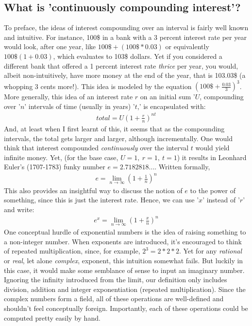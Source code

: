 \documentclass[11pt,a4paper]{article}
\begin{document}
\subsection{What is 'continuously compounding interest'?}
To preface, the ideas of interest compounding over an interval is fairly well known and intuitive. For instance, 100\$  in a bank with a 3 percent interest rate per year would look, after one year,  like $100\$ +(100\$*0.03)$ or equivalently $100\$(1+0.03)$, which evaluates to 103\$ dollars. Yet if you considered a different bank that offered a 1 percent interest rate \textit{thrice} per year, you would, albeit non-intuitively, have more money at the end of the year, that is 103.03\$ (a whopping 3 cents more!). This idea is modeled by the equation $(100\$ + \frac{0.03}{3})^3$.  More generally, this idea of an interest rate $r$ on an initial sum '$U$, compounding over '$n$' intervals of time (usually in years) '$t$,' is encapsulated with:
\begin{align*}
total = U \left(  1 + \frac{r}{n} \right)  ^{nt}
\end{align*}
And, at least when I first learnt of this, it seems that as the compounding intervals, the total gets larger and larger, although incrementally.  One would think that interest compounded \textit{continuously} over the interval $t$ would yield infinite money. Yet,  (for the base case, $U=1,\  r=1, \ t=1$) it results in Leonhard Euler's (1707-1783) funky number $e = 2.7182818...$. Written formally,
\begin{align*}
e = \lim_{n \to \infty} \left( 1+ \frac{1}{n} \right) ^n
\end{align*}
This also provides an insightful way to discuss the notion of $e$ to the power of something, since this is just the interest rate. Hence,  we can use '$x$' instead of '$r$' and write:
\begin{align*}
e^x = \lim_{n \to \infty} \left( 1+ \frac{x}{n} \right) ^n
\end{align*}
One conceptual hurdle of exponential numbers is the idea of raising something to a non-integer number.  When exponents are introduced, it's encouraged to think of repeated multiplication, since, for example, $2^3 = 2*2*2$. Yet for any \textit{rational} or \textit{real}, let alone \textit{complex}, exponent, this intuition somewhat fails.  But luckily in this case,  it would make some semblance of sense to input an imaginary number. Ignoring the infinity introduced from the limit, our definition only includes division, addition and integer exponentiation (repeated multiplication).  Since the complex numbers form a field, all of these operations are well-defined and shouldn't feel conceptually foreign.  Importantly, each of these operations could be computed pretty easily by hand. 
\end{document}
